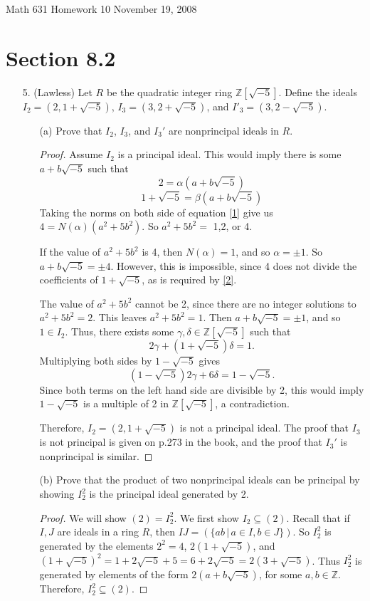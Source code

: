 \documentclass[10pt]{article}
\newcommand{\Z}{\mathbb{Z}}
\newcommand\header{{\sc Math 631 \hfill Homework 10 \hfill November 19, 2008}}
\begin{document}
\header

\section*{Section 8.2}

\begin{itemize}

\item[5.] (Lawless) Let $R$ be the quadratic integer ring $\Z[\sqrt{-5}]$. Define the ideals $I_2 = ( 2, 1+\sqrt{-5} )$, $I_3 = ( 3, 2+\sqrt{-5})$, and $I'_3 = ( 3, 2 - \sqrt{-5})$.
\begin{itemize}
\item[(a)] Prove that $I_2$, $I_3$, and $I_3'$ are nonprincipal ideals in $R$. 
\begin{proof}
Assume $I_2$ is a principal ideal. This would imply there is some $a + b\sqrt{-5}$ such that 
\begin{equation}\label{1}
2 = \alpha(a+b\sqrt{-5})
\end{equation}
\begin{equation}\label{2}
1+\sqrt{-5} = \beta(a+b\sqrt{-5})
\end{equation}
Taking the norms on both side of equation \eqref{1} give us $4 = N(\alpha)(a^2+5b^2)$. So $a^2 + 5b^2 =$ 1,2, or 4.

If the value of $a^2 + 5b^2$ is 4, then $N(\alpha) = 1$, and so $\alpha = \pm 1$. So $a+b\sqrt{-5} = \pm 4$. However, this is impossible, since 4 does not divide the coefficients of $1+\sqrt{-5}$, as is required by \eqref{2}. 

The value of $a^2+5b^2$ cannot be 2, since there are no integer solutions to $a^2 + 5b^2 = 2$. This leaves $a^2 + 5b^2 = 1$. Then $a+b\sqrt{-5} = \pm 1$, and so $1 \in I_2$. Thus, there exists some $\gamma,\delta \in \Z[\sqrt{-5}]$ such that 
$$2\gamma + (1+\sqrt{-5})\delta = 1.$$
Multiplying both sides by $1 - \sqrt{-5}$ gives
$$(1 - \sqrt{-5})2\gamma + 6\delta = 1 - \sqrt{-5}.$$
Since both terms on the left hand side are divisible by 2, this would imply $1-\sqrt{-5}$ is a multiple of 2 in $\Z[\sqrt{-5}]$, a contradiction. 

Therefore, $I_2 = (2,1+\sqrt{-5})$ is not a principal ideal. The proof that $I_3$ is not principal is given on p.273 in the book, and the proof that $I_3'$ is nonprincipal is similar. 
\end{proof}


\item[(b)] Prove that the product of two nonprincipal ideals can be principal by showing $I_2^2$ is the principal ideal generated by 2. 
\begin{proof}
We will show $(2) = I_2^2$. We first show $I_2 \subseteq (2)$. Recall that if $I,J$ are ideals in a ring $R$, then $IJ = ( \{ab \,|\, a \in I, b \in J\})$. So $I_2^2$ is generated by the elements $2^2 = 4$, $2(1+\sqrt{-5})$, and $(1 + \sqrt{-5})^2 = 1 + 2\sqrt{-5} + 5 = 6 + 2\sqrt{-5} = 2(3 + \sqrt{-5})$. Thus $I_2^2$ is generated by elements of the form $2(a+b\sqrt{-5})$, for some $a,b \in \Z$. Therefore, $I_2^2 \subseteq (2)$.


\end{proof}
\end{itemize}
\end{itemize}
\end{document}
